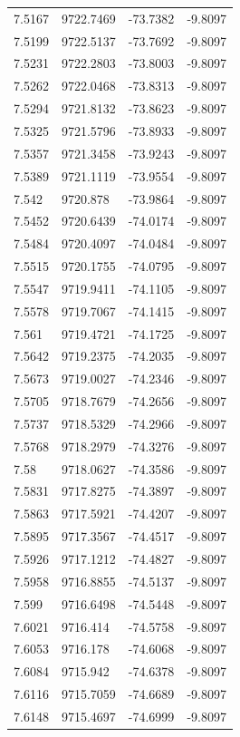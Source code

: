 \begin{table}[H]
\begin{tabular}{llll}
7.5167 & 9722.7469 & -73.7382 & -9.8097 \\
7.5199 & 9722.5137 & -73.7692 & -9.8097 \\
7.5231 & 9722.2803 & -73.8003 & -9.8097 \\
7.5262 & 9722.0468 & -73.8313 & -9.8097 \\
7.5294 & 9721.8132 & -73.8623 & -9.8097 \\
7.5325 & 9721.5796 & -73.8933 & -9.8097 \\
7.5357 & 9721.3458 & -73.9243 & -9.8097 \\
7.5389 & 9721.1119 & -73.9554 & -9.8097 \\
7.542 & 9720.878 & -73.9864 & -9.8097 \\
7.5452 & 9720.6439 & -74.0174 & -9.8097 \\
7.5484 & 9720.4097 & -74.0484 & -9.8097 \\
7.5515 & 9720.1755 & -74.0795 & -9.8097 \\
7.5547 & 9719.9411 & -74.1105 & -9.8097 \\
7.5578 & 9719.7067 & -74.1415 & -9.8097 \\
7.561 & 9719.4721 & -74.1725 & -9.8097 \\
7.5642 & 9719.2375 & -74.2035 & -9.8097 \\
7.5673 & 9719.0027 & -74.2346 & -9.8097 \\
7.5705 & 9718.7679 & -74.2656 & -9.8097 \\
7.5737 & 9718.5329 & -74.2966 & -9.8097 \\
7.5768 & 9718.2979 & -74.3276 & -9.8097 \\
7.58 & 9718.0627 & -74.3586 & -9.8097 \\
7.5831 & 9717.8275 & -74.3897 & -9.8097 \\
7.5863 & 9717.5921 & -74.4207 & -9.8097 \\
7.5895 & 9717.3567 & -74.4517 & -9.8097 \\
7.5926 & 9717.1212 & -74.4827 & -9.8097 \\
7.5958 & 9716.8855 & -74.5137 & -9.8097 \\
7.599 & 9716.6498 & -74.5448 & -9.8097 \\
7.6021 & 9716.414 & -74.5758 & -9.8097 \\
7.6053 & 9716.178 & -74.6068 & -9.8097 \\
7.6084 & 9715.942 & -74.6378 & -9.8097 \\
7.6116 & 9715.7059 & -74.6689 & -9.8097 \\
7.6148 & 9715.4697 & -74.6999 & -9.8097 \\

\end{tabular}
\end{table}

